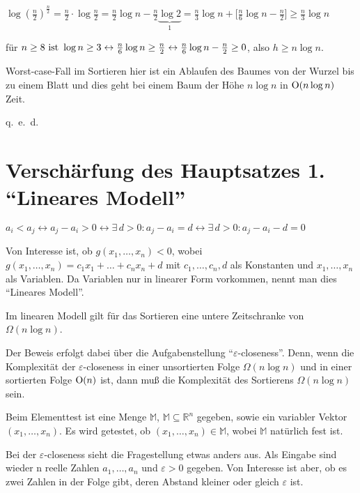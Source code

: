 \begin{beweis}
\(\log \left(\frac{n}{2}\right)^{\frac{n}{2}} = \frac{n}{2} \cdot \log \frac{n}{2} = \frac{n}{2} \log n - \frac{n}{2}
\underbrace{\log 2}_{1} = \frac{n}{3} \log n + \lbrack \frac{n}{6} \log n - \frac{n}{2} \rbrack \geq \frac {n}{3} \log n \) 

für \( n \geq 8\ \textup{ist}\ \log n \geq 3 \leftrightarrow \frac{n}{6} \log n \geq \frac {n}{2} 
\leftrightarrow \frac{n}{6} \log n - \frac{n}{2} \geq 0\), also \(h \geq n \log n\).

Worst-case-Fall im Sortieren hier ist ein Ablaufen des Baumes von der Wurzel bis zu einem Blatt und dies geht bei einem Baum der Höhe \(n
\log n\) in \(\textup{O}(n \log n)\) Zeit.
\end{beweis}
\hfill q.~e.~d. 

\section{Verschärfung des Hauptsatzes 1. "`Lineares Modell"'}

\( a_i < a_j \leftrightarrow a_j - a_i > 0
\leftrightarrow \exists \,d > 0 : a_j - a_i = d
\leftrightarrow \exists \, d > 0 : a_j - a_i - d = 0 \) 
\bigskip

Von Interesse ist, ob \( g(x_1 , \dots , x_n) < 0 \), wobei \( g(x_1 , \dots , x_n) = c_1 x_1 + \dots + c_n x_n + d \) mit
\( c_1, \dots , c_n, d \) als Konstanten und \( x_1, \dots, x_n  \) als Variablen.
Da Variablen nur in linearer Form vorkommen, nennt man dies "`Lineares Modell"'.

\begin{satz}
Im linearen Modell gilt für das Sortieren eine untere Zeitschranke von \( \Omega (n \log n) \).
\end{satz}
		
Der Beweis erfolgt dabei über die Aufgabenstellung "`$\varepsilon$-closeness"'. Denn, wenn die Komplexität der $\varepsilon$-closeness
in einer unsortierten Folge \( \Omega (n \log n) \) und in einer sortierten Folge \( \textup{O}(n)\) ist, dann muß die Komplexität des
Sortierens \( \Omega (n \log n)\) sein.
		
Beim Elementtest ist eine Menge \( \mathbb{M} \), \( \mathbb{M} \subseteq \mathbb{R}^n\) gegeben, sowie ein variabler Vektor \(
(x_1, \dots , x_n) \). Es wird getestet, ob \( (x_1, \dots , x_n) \in \mathbb{M} \), wobei \( \mathbb{M} \) natürlich fest ist. 
	
Bei der $\varepsilon$-closeness sieht die Fragestellung etwas anders aus. Als Eingabe sind wieder n reelle Zahlen \(a_1, \dots , a_n \)
und \( \varepsilon > 0 \) gegeben. Von Interesse ist aber, ob es zwei Zahlen in der Folge gibt, deren Abstand kleiner oder gleich
$\varepsilon$ ist.

